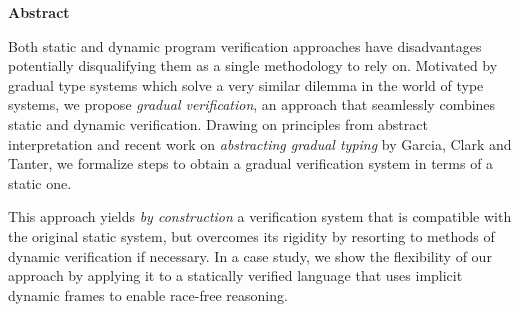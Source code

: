 \begin{center}
\begin{minipage}{0.7\textwidth}
\vspace*{15\baselineskip}
\begin{center}
\textbf{Abstract}
\end{center}
Both static and dynamic program verification approaches have disadvantages potentially disqualifying them as a single methodology to rely on.
Motivated by gradual type systems which solve a very similar dilemma in the world of type systems, we propose \textit{gradual verification}, an approach that seamlessly combines static and dynamic verification.
Drawing on principles from abstract interpretation and recent work on \textit{abstracting gradual typing} by Garcia, Clark and Tanter, we formalize steps to obtain a gradual verification system in terms of a static one.

This approach yields \textit{by construction} a verification system that is compatible with the original static system, but overcomes its rigidity by resorting to methods of dynamic verification if necessary.
In a case study, we show the flexibility of our approach by applying it to a statically verified language that uses implicit dynamic frames to enable race-free reasoning.
\end{minipage}
\end{center}
